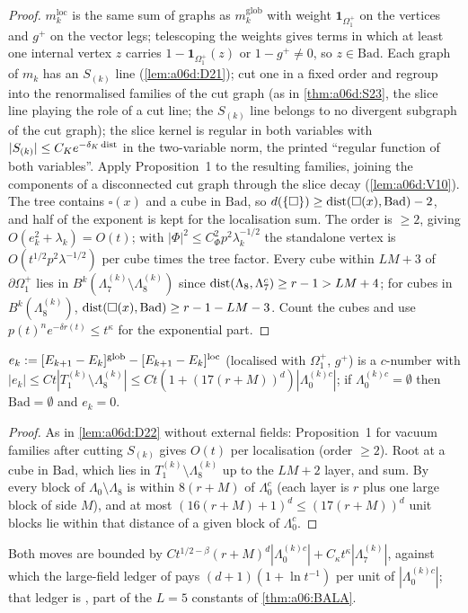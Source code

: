 \begin{proof}
$m^{\mathrm{loc}}_k$ is the same sum of graphs as $m^{\mathrm{glob}}_k$ with weight $\mathbf 1_{\Omega^+_1}$ on the \cite[(1.6)--(1.7)]{Ba3} vertices and $g^+$ on the vector legs; telescoping the weights gives terms in which at least one internal vertex $z$ carries $1-\mathbf 1_{\Omega^+_1}(z)$ or $1-g^+\ne0$, so $z\in\mathrm{Bad}$. Each graph of $m_k$ has an $S_{(k)}$ line (\cref{lem:a06d:D21}); cut one in a fixed order and regroup into the renormalised families of the cut graph (as in \cref{thm:a06d:S23}, the slice line playing the role of a cut line; the $S_{(k)}$ line belongs to no divergent subgraph of the cut graph); the slice kernel is regular in both variables with $|S_{(k)}|\le C_Ke^{-\delta_K\operatorname{dist}}$ in the two-variable norm, the printed ``regular function of both variables''. Apply Proposition~1 to the resulting families, joining the components of a disconnected cut graph through the slice decay (\cref{lem:a06d:V10}). The tree contains $\square(x)$ and a cube in $\mathrm{Bad}$, so $d(\{\square\})\ge\operatorname{dist}(\square(x),\mathrm{Bad})-2$, and half of the exponent is kept for the localisation sum. The order is $\ge2$, giving $O(e_k^2+\lambda_k)=O(t)$; with $|\Phi|^2\le C^2_\Phi p^2\lambda_k^{-1/2}$ the standalone vertex is $O(t^{1/2}p^2\lambda^{-1/2})$ per cube times the tree factor. Every cube within $LM+3$ of $\partial\Omega^+_1$ lies in $B^k(\Lambda^{(k)}_7\setminus\Lambda^{(k)}_8)$ since $\operatorname{dist}(\Lambda_8,\Lambda^c_7)\ge r-1>LM+4$; for cubes in $B^k(\Lambda^{(k)}_8)$, $\operatorname{dist}(\square(x),\mathrm{Bad})\ge r-1-LM-3$. Count the cubes and use $p(t)^ne^{-\delta r(t)}\le t^\kappa$ for the exponential part.
\end{proof}

\begin{lemma}\label{lem:a06d:D23}
$e_k:=[E_{k+1}-E_k]^{\mathrm{glob}}-[E_{k+1}-E_k]^{\mathrm{loc}}$ (localised with $\Omega^+_1$, $g^+$) is a $c$-number with $|e_k|\le Ct|T^{(k)}_1\setminus\Lambda^{(k)}_8|\le Ct(1+(17(r+M))^d)|\Lambda^{(k)c}_0|$; if $\Lambda^{(k)c}_0=\emptyset$ then $\mathrm{Bad}=\emptyset$ and $e_k=0$.
\end{lemma}

\begin{proof}
As in \cref{lem:a06d:D22} without external fields: Proposition~1 for vacuum families after cutting $S_{(k)}$ gives $O(t)$ per localisation (order $\ge2$). Root at a cube in $\mathrm{Bad}$, which lies in $T^{(k)}_1\setminus\Lambda^{(k)}_8$ up to the $LM+2$ layer, and sum. By \cite[(2.8)]{Ba2} every block of $\Lambda_0\setminus\Lambda_8$ is within $8(r+M)$ of $\Lambda^c_0$ (each layer is $r$ plus one large block of side $M$), and at most $(16(r+M)+1)^d\le(17(r+M))^d$ unit blocks lie within that distance of a given block of $\Lambda^c_0$.
\end{proof}

Both moves are bounded by $Ct^{1/2-\beta}(r+M)^d|\Lambda^{(k)c}_0|+C_\kappa t^\kappa|\Lambda^{(k)}_7|$, against which the large-field ledger of \cite[Sect.~3C]{Ba2} pays $(d+1)(1+\ln t^{-1})$ per unit of $|\Lambda^{(k)c}_0|$; that ledger is \cite[(3.42)]{Ba2}, part of the $L=5$ constants of \cref{thm:a06:BALA}.
